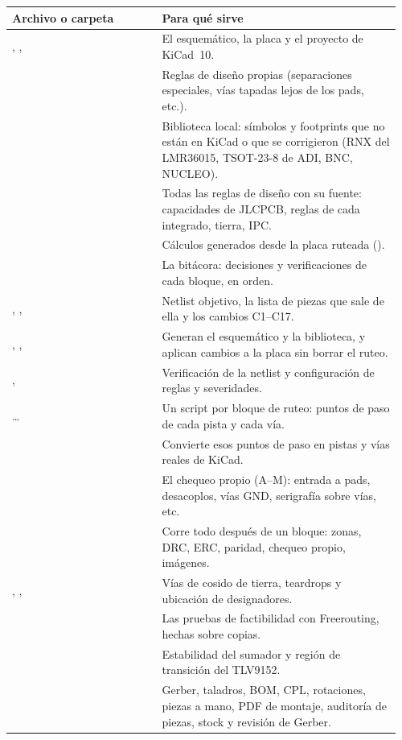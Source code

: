 \begin{longtable}{@{}L{0.37\linewidth}L{0.59\linewidth}@{}}
\toprule
\textbf{Archivo o carpeta} & \textbf{Para qué sirve}\\
\midrule\endhead
{}, ,  & El esquemático, la placa y el proyecto de KiCad~10.\\
 & Reglas de diseño propias (separaciones especiales, vías tapadas lejos de los pads, etc.).\\
 & Biblioteca local: símbolos y footprints que no están en KiCad o que se corrigieron (RNX del LMR36015, TSOT-23-8 de ADI, BNC, NUCLEO).\\
 & Todas las reglas de diseño con su fuente: capacidades de JLCPCB, reglas de cada integrado, tierra, IPC.\\
 & Cálculos generados desde la placa ruteada ().\\
 & La bitácora: decisiones y verificaciones de cada bloque, en orden.\\
, ,  & Netlist objetivo, la lista de piezas que sale de ella y los cambios C1--C17.\\
, ,  & Generan el esquemático y la biblioteca, y aplican cambios a la placa sin borrar el ruteo.\\
,  & Verificación de la netlist y configuración de reglas y severidades.\\
 \ldots{}  & Un script por bloque de ruteo: puntos de paso de cada pista y cada vía.\\
 & Convierte esos puntos de paso en pistas y vías reales de KiCad.\\
 & El chequeo propio (A--M): entrada a pads, desacoplos, vías GND, serigrafía sobre vías, etc.\\
 & Corre todo después de un bloque: zonas, DRC, ERC, paridad, chequeo propio, imágenes.\\
, ,  & Vías de cosido de tierra, teardrops y ubicación de designadores.\\
 & Las pruebas de factibilidad con Freerouting, hechas sobre copias.\\
 & Estabilidad del sumador y región de transición del TLV9152.\\
 & Gerber, taladros, BOM, CPL, rotaciones, piezas a mano, PDF de montaje, auditoría de piezas, stock y revisión de Gerber.\\
\bottomrule
\end{longtable}

